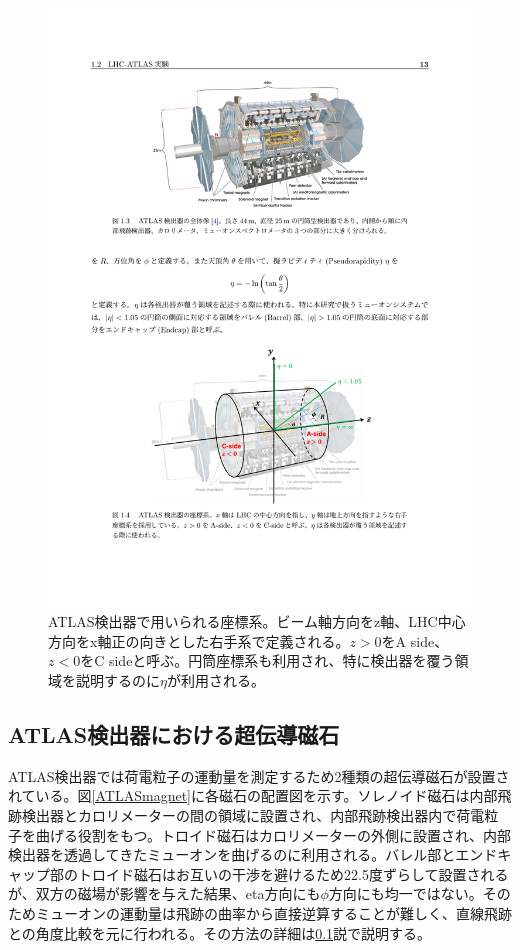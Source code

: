    \begin{figure} 
    \centering
    \includegraphics[width=16cm]{fig/Intro/ATLAScordination.pdf}
    \caption[ATLAS検出器における座標系]{ATLAS検出器で用いられる座標系。ビーム軸方向をz軸、LHC中心方向をx軸正の向きとした右手系で定義される。$z>0$をA side、$z<0$をC sideと呼ぶ。円筒座標系も利用され、特に検出器を覆う領域を説明するのに$\eta$が利用される。}
    \label{ATLAScordination}
    \end{figure}
  
    \subsection{ATLAS検出器における超伝導磁石}
    ATLAS検出器では荷電粒子の運動量を測定するため2種類の超伝導磁石が設置されている。図\ref{ATLASmagnet}に各磁石の配置図を示す。ソレノイド磁石は内部飛跡検出器とカロリメーターの間の領域に設置され、内部飛跡検出器内で荷電粒子を曲げる役割をもつ。トロイド磁石はカロリメーターの外側に設置され、内部検出器を透過してきたミューオンを曲げるのに利用される。バレル部とエンドキャップ部のトロイド磁石はお互いの干渉を避けるため22.5度ずらして設置されるが、双方の磁場が影響を与えた結果、eta方向にも$\phi$方向にも均一ではない。そのためミューオンの運動量は飛跡の曲率から直接逆算することが難しく、直線飛跡との角度比較を元に行われる。その方法の詳細は\ref{}説で説明する。

